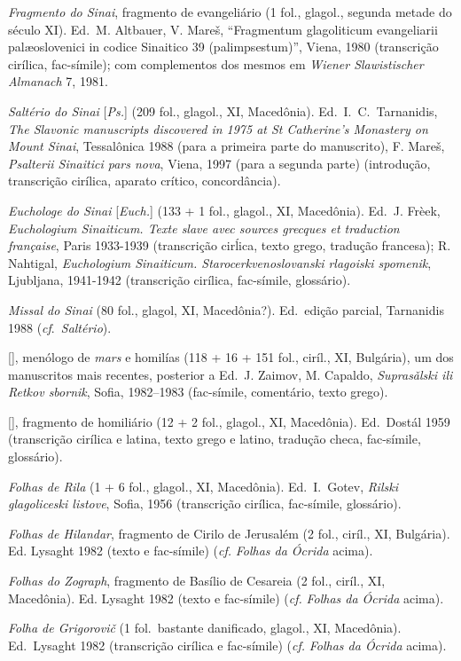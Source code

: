\begin{compactitem}[--]
	\item \emph{Fragmento do Sinai}, fragmento de evangeliário (1 fol., glagol.,
	segunda metade do século XI). Ed.\ M. Altbauer, V. Mareš, ``Fragmentum
	glagoliticum evangeliarii palæoslovenici in codice Sinaitico 39
	(palimpsestum)'', Viena, 1980 (transcrição cirílica, fac-símile); com
	complementos dos mesmos em \emph{Wiener Slawistischer Almanach} 7, 1981.
	\item \emph{Saltério do Sinai} [\emph{Ps.}] (209 fol., glagol., XI,
	Macedônia). Ed.\  I.~C.\ Tarnanidis, \emph{The Slavonic manuscripts
		discovered in 1975 at St Catherine's Monastery on Mount Sinai},
	Tessalônica 1988 (para a primeira parte do manuscrito), F. Mareš,
	\emph{Psalterii Sinaitici pars nova}, Viena, 1997 (para a segunda parte)
	(introdução, transcrição cirílica, aparato crítico, concordância).
	\item \emph{Euchologe do Sinai} [\emph{Euch.}] (133 + 1 fol., glagol., XI,
	Macedônia). Ed.\ J. Frèek, \emph{Euchologium Sinaiticum. Texte slave avec
		sources grecques et traduction française}, Paris 1933-1939 (transcrição
	cirĺica, texto grego, tradução francesa); R. Nahtigal, \emph{Euchologium
		Sinaiticum. Starocerkvenoslovanski rlagoiski spomenik}, Ljubljana,
	1941-1942 (transcrição cirílica, fac-símile, glossário).
	\item \emph{Missal do Sinai} (80 fol., glagol, XI, Macedônia?). Ed.\ edição
	parcial, Tarnanidis 1988 (\emph{cf}.\ \emph{Saltério}).
	\item {} [], menólogo de \emph{mars} e
	homilías (118 + 16 + 151 fol., ciríl., XI, Bulgária), um dos manuscritos
	mais recentes, posterior a  Ed.\ J. Zaimov, M. Capaldo,
	\emph{Suprasǎlski ili Retkov sbornik}, Sofia, 1982--1983 (fac-símile,
	comentário, texto grego).
	\item {} [], fragmento de homiliário (12 + 2 fol.,
	glagol., XI, Macedônia). Ed.\ Dostál 1959 (transcrição cirílica e latina,
	texto grego e latino, tradução checa, fac-símile, glossário).
	\item \emph{Folhas de Rila} (1 + 6 fol., glagol., XI, Macedônia). Ed.\ I.\
	Gotev, \emph{Rilski glagoliceski listove}, Sofia, 1956 (transcrição
	cirílica, fac-símile, glossário).
	\item \emph{Folhas de Hilandar}, fragmento de Cirilo de Jerusalém (2 fol.,
	ciríl., XI, Bulgária). Ed. Lysaght 1982 (texto e fac-símile) (\emph{cf.}
	\emph{Folhas da Ócrida} acima).
	\item \emph{Folhas do Zograph}, fragmento de Basílio de Cesareia (2 fol.,
	ciríl., XI, Macedônia). Ed. Lysaght 1982 (texto e fac-símile) (\emph{cf.}
	\emph{Folhas da Ócrida} acima).
	\item \emph{Folha de Grigorovič} (1 fol.\ bastante danificado, glagol., XI,
	Macedônia). Ed.\ Lysaght 1982 (transcrição cirílica e fac-símile)
	(\emph{cf.} \emph{Folhas da Ócrida} acima).
\end{compactitem}

